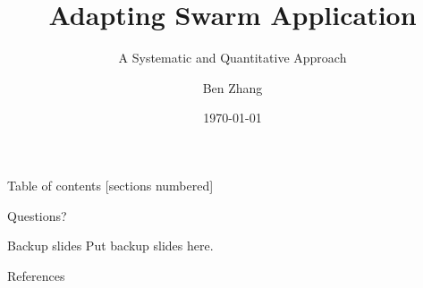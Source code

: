 \documentclass[10pt]{beamer}
\title{Adapting Swarm Application}
\subtitle{A Systematic and Quantitative Approach}
\date{\today}
\author{Ben Zhang}
\begin{document}
\maketitle

\begin{frame}{Table of contents}
  [sections numbered]
  \tableofcontents[hideallsubsections]
\end{frame}

% 
% 
% 
% 
% 

\appendix



\begin{frame}[standout]
  Questions?
\end{frame}

\begin{frame}[fragile]{Backup slides}
  Put backup slides here.
\end{frame}

{

  \begin{frame}[allowframebreaks]{References}
    
    
  \end{frame}
}
\end{document}
